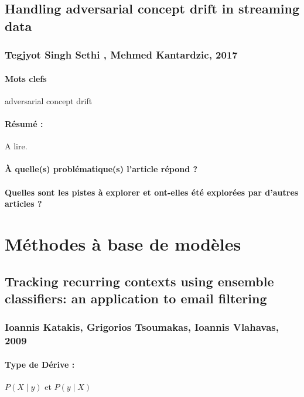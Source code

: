 \documentclass[11pt,a4paper]{report}
\begin{document}
\subsection{Handling adversarial concept drift in streaming data}
\subsubsection{Tegjyot Singh Sethi , Mehmed Kantardzic, 2017}

\paragraph{Mots clefs}  adversarial concept drift 

\paragraph{Résumé :} A lire.

\paragraph{À quelle(s) problématique(s) l'article répond ?}

\paragraph{Quelles sont les pistes à explorer et ont-elles  été explorées par d'autres articles ?}







\newpage







\section{Méthodes à base de modèles}
\subsection{Tracking recurring contexts using ensemble classifiers: an application to email filtering}
\subsubsection{Ioannis Katakis, Grigorios Tsoumakas, Ioannis Vlahavas, 2009}

\paragraph{Type de Dérive :} $P(X\mid y)$ et $P(y \mid X)$
\end{document}
